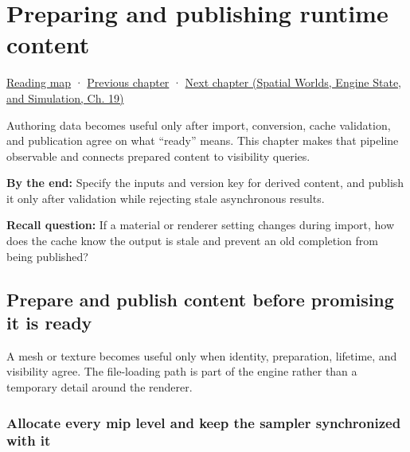 \chapter{Preparing and publishing runtime content}\label{06-engine-ii-ch027-preparing-and-publishing-runtime-content}\hypertarget{06-engine-ii-ch027}{}\label{stagechapter:06-engine-ii-ch027}

\hypertarget{06-engine-ii-ch027-preparing-and-publishing-runtime-content}{}

\hyperref[volume-reading-map]{Reading map} · \hyperref[06-engine-ii-ch026-descriptor-arrays-and-backend-limits]{Previous chapter} · \href{../05-Spatial-Worlds-Engine-State-and-Simulation/main.pdf\#nameddest=06-engine-ii-ch028-bvh-traversal-refitting-and-simd}{Next chapter (Spatial Worlds, Engine State, and Simulation, Ch. 19)}

Authoring data becomes useful only after import, conversion, cache validation, and publication agree on what ``ready'' means. This chapter makes that pipeline observable and connects prepared content to visibility queries.

\textbf{By the end:} Specify the inputs and version key for derived content, and publish it only after validation while rejecting stale asynchronous results.

\textbf{Recall question:} If a material or renderer setting changes during import, how does the cache know the output is stale and prevent an old completion from being published?

\section{Prepare and publish content before promising it is ready}\label{06-engine-ii-ch027-prepare-and-publish-content-before-promising-it-is-ready}

\hypertarget{06-engine-ii-ch027-prepare-and-publish-content-before-promising-it-is-ready}{}

A mesh or texture becomes useful only when identity, preparation, lifetime, and visibility agree. The file-loading path is part of the engine rather than a temporary detail around the renderer.

\subsection{Allocate every mip level and keep the sampler synchronized with it}\label{06-engine-ii-ch027-allocate-every-mip-level-and-keep-the-sampler-synchronized-with-it}

